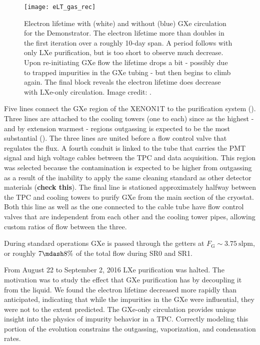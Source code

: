 \begin{figure}
\centering
\texttt{[image: eLT\_gas\_rec]}
\caption{Electron lifetime with (white) and without (blue) GXe circulation for the Demonstrator.  The electron lifetime more than doubles
in the first iteration over a roughly 10-day span.  A period follows with
only LXe purification, but is too short to observe much decrease.  Upon re-initiating GXe flow the lifetime drops a bit - possibly due to
trapped impurities in the GXe tubing - but then begins to climb again.  The final block reveals the electron lifetime does
decrease with LXe-only circulation.  Image credit: .}
\label{fig:electron_lifetime_model_gxe_demonstrator}
\end{figure}

Five lines connect the GXe region of the XENON1T to the purification system ().  Three lines are attached to
the cooling towers (one to each) since as the highest - and by extension warmest - regions outgassing is expected to be the most
substantial ().  The three lines are united before a flow control valve
that regulates the flux.  A fourth conduit is linked to the tube that carries the PMT signal and high voltage cables between the TPC and
data acquisition.  This region was selected because the contamination is expected to be higher from outgassing as a result of the
inability to apply the same cleaning standard as other detector materials (\textbf{check this}).  The final line is stationed
approximately halfway between the TPC and cooling towers to purify GXe from the main section of the cryostat.  Both this line as well
as the one connected to the cable tube have flow control valves that are independent from each other and the cooling tower pipes, allowing
custom ratios of flow between the three.

During standard operations GXe is passed through the getters at $F_{\mathrm{G}} {\sim} 3.75\ \mathrm{slpm}$, or roughly $7 \mdash 8\%$ of
the total flow during SR0 and SR1.

From August 22 to September 2, 2016 LXe purification was halted.  The motivation was to study the effect that GXe purification has by
decoupling it from the liquid.  We found the electron lifetime decreased more rapidly than anticipated, indicating that while the
impurities in the GXe were influential, they were not to the extent predicted.  The GXe-only circulation provides unique insight into
the physics of impurity behavior in a TPC.  Correctly modeling this portion of the evolution constrains the outgassing, vaporization,
and condensation rates.




